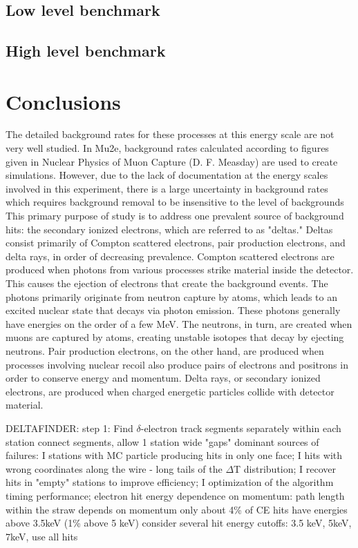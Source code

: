 \section{}
\subsection{Low level benchmark}
\subsection{High level benchmark}

\section{Conclusions}
\iffalse

 The detailed background rates for these processes at this energy scale are not very
well studied. In Mu2e, background rates calculated according to figures given in Nuclear Physics of
Muon Capture (D. F. Measday) are used to create simulations. However, due to the lack of
documentation at the energy scales involved in this experiment, there is a large uncertainty in
background rates which requires background removal to be insensitive to the level of backgrounds
This primary purpose of study is to address one prevalent source of background hits: the
secondary ionized electrons, which are referred to as "deltas." Deltas consist primarily of Compton
scattered electrons, pair production electrons, and delta rays, in order of decreasing prevalence.
Compton scattered electrons are produced when photons from various processes strike material
inside the detector. This causes the ejection of electrons that create the background events. The
photons primarily originate from neutron capture by atoms, which leads to an excited nuclear state
that decays via photon emission. These photons generally have energies on the order of a few MeV.
The neutrons, in turn, are created when muons are captured by atoms, creating unstable isotopes that
decay by ejecting neutrons. Pair production electrons, on the other hand, are produced when
processes involving nuclear recoil also produce pairs of electrons and positrons in order to conserve
energy and momentum. Delta rays, or secondary ionized electrons, are produced when charged
energetic particles collide with detector material.






DELTAFINDER:
step 1: Find $\delta$-electron track segments separately within each station
connect segments, allow 1 station wide "gaps"
dominant sources of failures:
I stations with MC particle producing hits in only one face;
I hits with wrong coordinates along the wire - long tails of the $\Delta$T distribution;
I recover hits in "empty" stations to improve efficiency;
I optimization of the algorithm timing performance;
electron hit energy dependence on momentum: path length within the straw depends on momentum
only about 4\% of CE hits have energies above 3.5keV (1\% above 5 keV)
consider several hit energy cutoffs: 3.5 keV, 5keV, 7keV, use all hits




